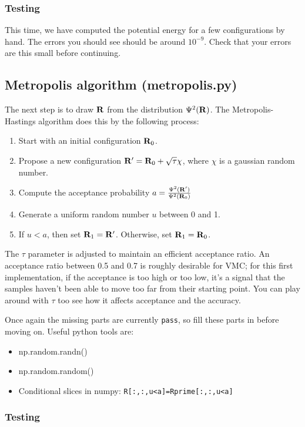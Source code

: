 \documentclass[12pt]{article}
\newcommand{\bR}{{\bf R}}
\begin{document}
\subsubsection{Testing}

This time, we have computed the potential energy for a few configurations by hand. 
The errors you should see should be around $10^{-9}$.
Check that your errors are this small before continuing.

\subsection{Metropolis algorithm (metropolis.py)}

The next step is to draw $\bR$ from the distribution $\Psi^2(\bR)$. 
The Metropolis-Hastings algorithm does this by the following process:
\begin{enumerate}
\item Start with an initial configuration $\bR_0$. 	
\item Propose a new configuration $\bR'=\bR_0 + \sqrt{\tau} \chi$, where $\chi$ is a gaussian random number.
\item Compute the acceptance probability $a=\frac{\Psi^2(\bR')}{\Psi^2(\bR_0)}$
\item Generate a uniform random number $u$ between 0 and 1. 
\item If $u < a$, then set $\bR_1=\bR'$. Otherwise, set $\bR_1=\bR_0$.
\end{enumerate}

The $\tau$ parameter is adjusted to maintain an efficient acceptance ratio. 
An acceptance ratio between 0.5 and 0.7 is roughly desirable for VMC; for this first implementation, if the acceptance is too high or too low, it's a signal that the samples haven't been able to move too far from their starting point.
You can play around with $\tau$ too see how it affects acceptance and the accuracy.

Once again the missing parts are currently \verb|pass|, so fill these parts in before moving on. 
Useful python tools are:
\begin{itemize}
\item np.random.randn()
\item np.random.random()
\item Conditional slices in numpy: \verb|R[:,:,u<a]=Rprime[:,:,u<a]|
\end{itemize}

\subsubsection{Testing}
\end{document}
